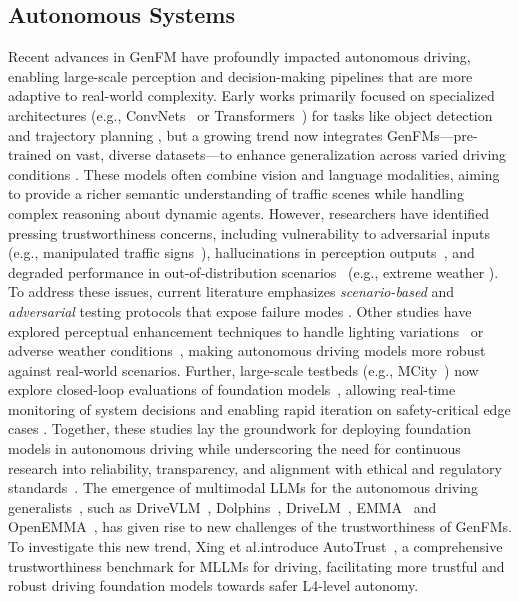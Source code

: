 \subsection{Autonomous Systems}

Recent advances in GenFM have profoundly impacted autonomous driving, enabling large-scale perception and decision-making pipelines that are more adaptive to real-world complexity. 
Early works primarily focused on specialized architectures (e.g., ConvNets~\cite{he2016deep,lang2019pointpillars} or Transformers~\cite{alexey2020image,li2022bevformer}) for tasks like object detection~\cite{li2021free} and trajectory planning \cite{teng2023motion}, but a growing trend now integrates GenFMs—pre-trained on vast, diverse datasets—to enhance generalization across varied driving conditions \cite{chen2022pali,gpt4v,li2024llava,hu2023planning}. 
These models often combine vision and language modalities, aiming to provide a richer semantic understanding of traffic scenes while handling complex reasoning about dynamic agents. 
However, researchers have identified pressing trustworthiness concerns, including vulnerability to adversarial inputs~\cite{zhou2020deepbillboard} (e.g., manipulated traffic signs~\cite{pavlitska2023adversarial}), hallucinations in perception outputs~\cite{chen2024multi}, and degraded performance in out-of-distribution scenarios~\cite{nitsch2021out} (e.g., extreme weather \cite{bijelic2018benchmarking,zhu2024mwformer}). To address these issues, current literature emphasizes \emph{scenario-based} and \emph{adversarial} testing protocols that expose failure modes \cite{li2024scenarionet,ding2023survey}. Other studies have explored perceptual enhancement techniques to handle lighting variations~\cite{li2024light} or adverse weather conditions~\cite{zhu2024mwformer}, making autonomous driving models more robust against real-world scenarios.  Further, large-scale testbeds (e.g., MCity~\cite{feng2023dense}) now explore closed-loop evaluations of foundation models~\cite{shao2024lmdrive}, allowing real-time monitoring of system decisions and enabling rapid iteration on safety-critical edge cases \cite{ding2023survey}. Together, these studies lay the groundwork for deploying foundation models in autonomous driving while underscoring the need for continuous research into reliability, transparency, and alignment with ethical and regulatory standards~\cite{krugel2024risk}. The emergence of multimodal LLMs for the autonomous driving generalists~\cite{cui2024survey}, such as  DriveVLM~\cite{tian2024drivevlm}, Dolphins~\cite{ma2025dolphins}, DriveLM~\cite{sima2025drivelm}, EMMA~\cite{hwang2024emma} and OpenEMMA~\cite{xing2024openemma}, has given rise to new challenges of the trustworthiness of GenFMs. To investigate this new trend, Xing et al.introduce AutoTrust~\cite{xing2024autotrust}, a comprehensive trustworthiness benchmark for MLLMs for driving, facilitating more trustful and robust driving foundation models towards safer L4-level autonomy.

